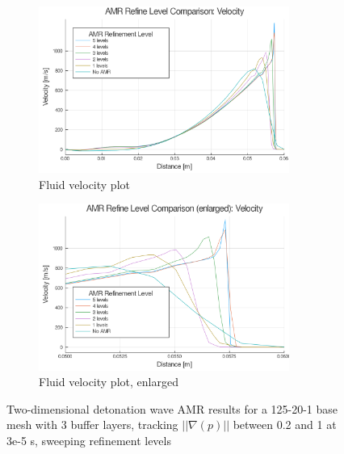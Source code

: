 \begin{figure} \ContinuedFloat
    
    \centering
    \begin{subfigure}[]{\textwidth}
        \centering
        \includegraphics[width=0.9\textwidth]{./figs/amrfigs/amr_refinelevels/u.png}
        \caption{Fluid velocity plot}
    \end{subfigure}

    \centering
    \begin{subfigure}[]{\textwidth}
        \centering
        \includegraphics[width=0.9\textwidth]{./figs/amrfigs/amr_refinelevels/ue.png}
        \caption{Fluid velocity plot, enlarged}
    \end{subfigure}

    \caption{Two-dimensional detonation wave AMR results for a 125-20-1 base mesh with 3 buffer layers, tracking \( ||\nabla(p)||\) between 0.2 and 1 at 3e-5 s, sweeping refinement levels}
    \label{fig:amr_refinelevels}
\end{figure}%
